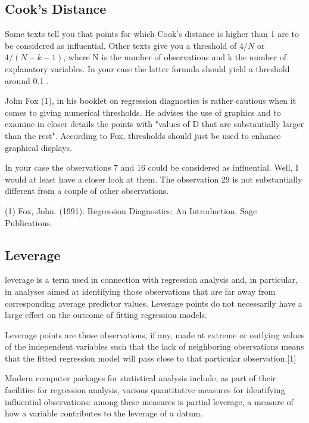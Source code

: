 \documentclass[12pt, a4paper]{article}
\theoremstyle{plain}
\theoremstyle{definition}
\theoremstyle{remark}
\begin{document}
\subsection{Cook's Distance}
Some texts tell you that points for which Cook's distance is higher than 1 are to be considered as influential. Other texts give you a threshold of $4/N$ or $4/(N−k−1)$, where N is the number of observations and k the number of explanatory variables. In your case the latter formula should yield a threshold around 0.1 .

John Fox (1), in his booklet on regression diagnostics is rather cautious when it comes to giving numerical thresholds. He advises the use of graphics and to examine in closer details the points with "values of D that are substantially larger than the rest". According to Fox, thresholds should just be used to enhance graphical displays.

In your case the observations 7 and 16 could be considered as influential. Well, I would at least have a closer look at them. The observation 29 is not substantially different from a couple of other observations.

(1) Fox, John. (1991). Regression Diagnostics: An Introduction. Sage Publications.
\subsection{Leverage}
 leverage is a term used in connection with regression analysis and, in particular, in analyses aimed at identifying those observations that are far away from corresponding average predictor values. Leverage points do not necessarily have a large effect on the outcome of fitting regression models.

Leverage points are those observations, if any, made at extreme or outlying values of the independent variables such that the lack of neighboring observations means that the fitted regression model will pass close to that particular observation.[1]

Modern computer packages for statistical analysis include, as part of their facilities for regression analysis, various quantitative measures for identifying influential observations: among these measures is partial leverage, a measure of how a variable contributes to the leverage of a datum.

\newpage
\end{document}

